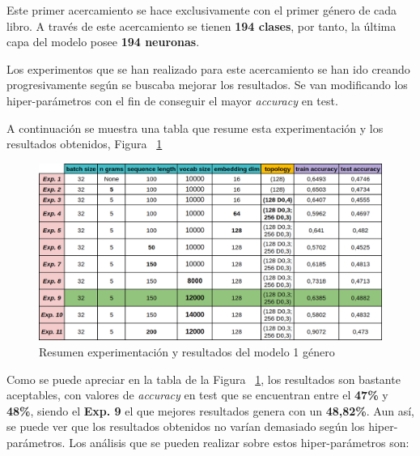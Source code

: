 \documentclass[12pt,a4paper, xcolor=table]{article}
\begin{document}
Este primer acercamiento se hace exclusivamente con el primer género de cada libro. A través de este acercamiento se tienen \textbf{194 clases}, por tanto, la última capa del modelo posee \textbf{194 neuronas}.

\vspace{2mm}

Los experimentos que se han realizado para este acercamiento se han ido creando progresivamente según se buscaba mejorar los resultados. Se van modificando los hiper-parámetros con el fin de conseguir el mayor \textit{accuracy} en test.

\vspace{1mm}

A continuación se muestra una tabla que resume esta experimentación y los resultados obtenidos, Figura ~\ref{fig:experimentos}

\begin{figure}[!h]
    \centering
    \includegraphics[width=500px]{img/one.png}
    \caption{Resumen experimentación y resultados del modelo 1 género}
    \label{fig:experimentos}
\end{figure}

Como se puede apreciar en la tabla de la Figura ~\ref{fig:experimentos}, los resultados son bastante aceptables, con valores de \textit{accuracy} en test que se encuentran entre el \textbf{47\%} y \textbf{48\%}, siendo el \textbf{Exp. 9} el que mejores resultados genera con un \textbf{48,82\%}. Aun así, se puede ver que los resultados obtenidos no varían demasiado según los hiper-parámetros. Los análisis que se pueden realizar sobre estos hiper-parámetros son:
\end{document}
